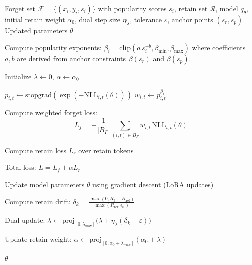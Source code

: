 \begin{algorithm}[t]
\caption{AdaPop}
\label{alg:adapop}
\begin{algorithmic}[1]
\REQUIRE Forget set $\mathcal{F}=\{(x_i,y_i,s_i)\}$ with popularity scores $s_i$, retain set $\mathcal{R}$, model $q_\theta$, initial retain weight $\alpha_0$, dual step size $\eta_\lambda$, tolerance $\varepsilon$, anchor points $(s_r, s_p)$
\ENSURE Updated parameters $\theta$

\STATE Compute popularity exponents:
\(
\beta_i = \mathrm{clip}(a\, s_i^{-b}, \beta_{\min}, \beta_{\max})
\)
where coefficients $a,b$ are derived from anchor constraints $\beta(s_r)$ and $\beta(s_p)$.

\STATE Initialize $\lambda \leftarrow 0$, $\alpha \leftarrow \alpha_0$



            \STATE $p_{i,t} \leftarrow \mathrm{stopgrad}(\exp(-\mathrm{NLL}_{i,t}(\theta)))$
            \STATE $w_{i,t} \leftarrow p_{i,t}^{\beta_i}$
        \ENDFOR

        \STATE Compute weighted forget loss:
        \[
        L_f = - \frac{1}{|B_F|} 
        \sum_{(i,t)\in B_F} w_{i,t}\,\mathrm{NLL}_{i,t}(\theta)
        \]

        \STATE Compute retain loss $L_r$ over retain tokens

        \STATE Total loss:
        \(
        L = L_f + \alpha L_r
        \)

        \STATE Update model parameters $\theta$ using gradient descent (LoRA updates)

    \ENDFOR

    \STATE Compute retain drift:
    \(
    \delta_k = \frac{\max(0, R_k - R_{\text{ref}})}{\max(R_{\text{ref}}, \epsilon_0)}
    \)

    \STATE Dual update:
    \(
    \lambda \leftarrow \mathrm{proj}_{[0,\lambda_{\max}]}\big(\lambda + \eta_\lambda(\delta_k - \varepsilon)\big)
    \)

    \STATE Update retain weight:
    \(
    \alpha \leftarrow \mathrm{proj}_{[0,\alpha_0+\lambda_{\max}]}(\alpha_0 + \lambda)
    \)

\ENDFOR

\RETURN $\theta$
\end{algorithmic}
\end{algorithm}

